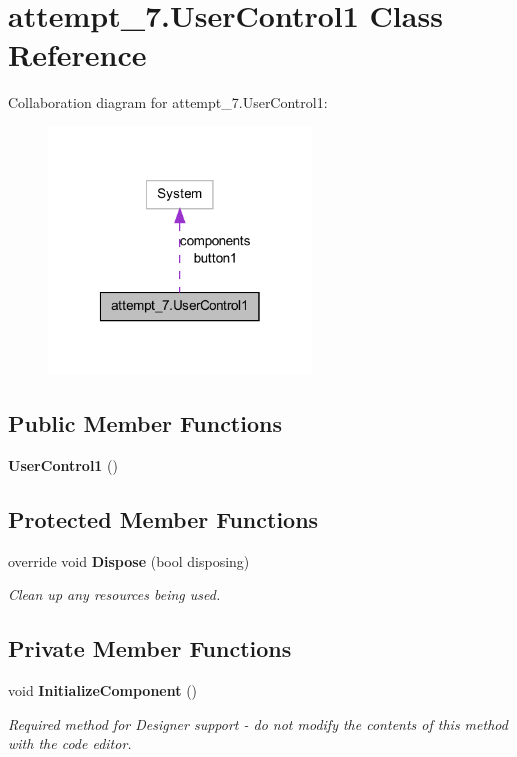 \section{attempt\_\-7.UserControl1 Class Reference}
\label{classattempt__7_1_1_user_control1}


Collaboration diagram for attempt\_\-7.UserControl1:\nopagebreak
\begin{figure}[H]
\begin{center}
\leavevmode
\includegraphics[width=198pt]{classattempt__7_1_1_user_control1__coll__graph}
\end{center}
\end{figure}
\subsection*{Public Member Functions}
\begin{DoxyCompactItemize}
\item 
{\bf UserControl1} ()
\end{DoxyCompactItemize}
\subsection*{Protected Member Functions}
\begin{DoxyCompactItemize}
\item 
override void {\bf Dispose} (bool disposing)
\begin{DoxyCompactList}\small\item\em Clean up any resources being used. \item\end{DoxyCompactList}\end{DoxyCompactItemize}
\subsection*{Private Member Functions}
\begin{DoxyCompactItemize}
\item 
void {\bf InitializeComponent} ()
\begin{DoxyCompactList}\small\item\em Required method for Designer support -\/ do not modify the contents of this method with the code editor. \item\end{DoxyCompactList}\end{DoxyCompactItemize}
